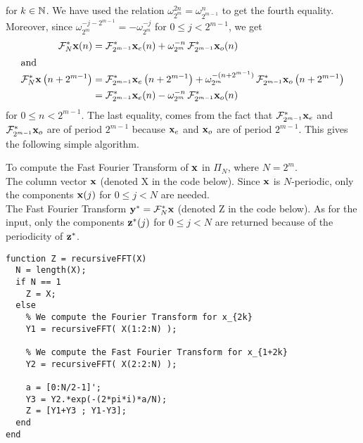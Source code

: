 \begin{rmkList}
\begin{enumerate}
for $k \in \mathbb{N}$.
We have used the relation $\omega_{2^m}^{2n} = \omega_{2^{m-1}}^n$ to
get the fourth equality.  Moreover, since
$\omega_{2^m}^{-j-2^{m-1}} = -\omega_{2^m}^{-j}$ for
$0 \leq j < 2^{m-1}$, we get
\begin{align*}
\mathcal{F}^\ast_N \mathbf{x}(n)
&= \mathcal{F}^\ast_{2^{m-1}} \mathbf{x}_{e}(n) + \omega_{2^m}^{-n} \,
\mathcal{F}^\ast_{2^{m-1}} \mathbf{x}_{o}(n) \\
\intertext{and}
\mathcal{F}^\ast_N \mathbf{x} \left(n+2^{m-1}\right)
&= \mathcal{F}^\ast_{2^{m-1}} \mathbf{x}_{e} \left(n+2^{m-1}\right)
+ \omega_{2^m}^{-(n+2^{m-1})} \, \mathcal{F}^\ast_{2^{m-1}}
\mathbf{x}_{o}\left(n+2^{m-1}\right) \\
&= \mathcal{F}^\ast_{2^{m-1}} \mathbf{x}_{e}(n) -
\omega_{2^m}^{-n} \, \mathcal{F}^\ast_{2^{m-1}} \mathbf{x}_{o}(n)
\end{align*}
for $0 \leq n < 2^{m-1}$.  The last equality, comes from the fact that
$\mathcal{F}^\ast_{2^{m-1}} \mathbf{x}_{e}$ and
$\mathcal{F}^\ast_{2^{m-1}} \mathbf{x}_{o}$ are of period $2^{m-1}$ because
$\mathbf{x}_{e}$ and $\mathbf{x}_{o}$ are of period $2^{m-1}$.
This gives the following simple algorithm.

\begin{code}
To compute the Fast Fourier Transform of $\mathbf{x}$ in $\Pi_N$, where
$N=2^m$. \\ 
 The column vector $\mathbf{x}$ (denoted X in the code
below).  Since $\mathbf{x}$ is $N$-periodic, only the
components $\mathbf{x}(j)$ for $0 \leq j < N$ are needed.\\
 The Fast Fourier Transform $\mathbf{y}^\ast= \mathcal{F}^\ast_N \mathbf{x}$
(denoted Z in the code below).  As for the input, only the 
components $\mathbf{z}^\ast(j)$ for $0 \leq j < N$ are returned because of
the periodicity of $\mathbf{z}^\ast$.
\small
\begin{verbatim}
function Z = recursiveFFT(X)
  N = length(X);
  if N == 1
    Z = X;
  else
    % We compute the Fourier Transform for x_{2k}
    Y1 = recursiveFFT( X(1:2:N) );

    % We compute the Fast Fourier Transform for x_{1+2k}
    Y2 = recursiveFFT( X(2:2:N) );

    a = [0:N/2-1]';
    Y3 = Y2.*exp(-(2*pi*i)*a/N);
    Z = [Y1+Y3 ; Y1-Y3];
  end
end
\end{verbatim}
\end{code}

\end{enumerate}
\end{rmkList}

